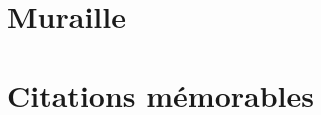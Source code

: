 \documentclass[poly,trombi]{valbonne}
\begin{document}



\chapter{Muraille}


\newpage





\chapter{Citations mémorables}

\end{document}
